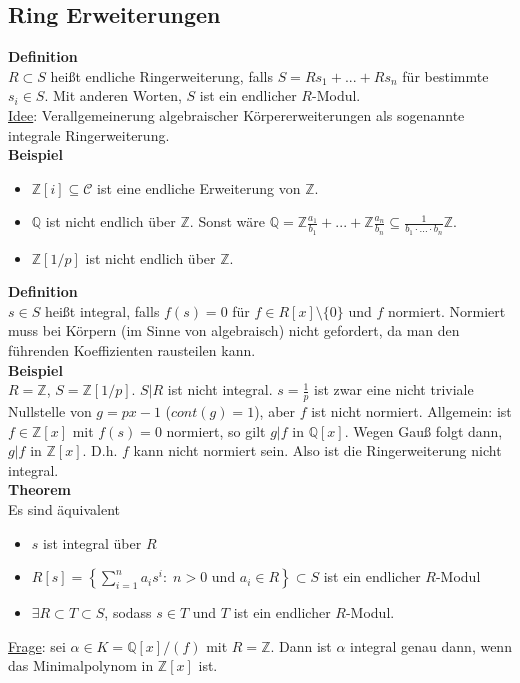 \documentclass[a4paper, 12pt]{article}
\begin{document}
\subsection{Ring Erweiterungen}
\textbf{Definition}\\
$R \subset S$ heißt endliche Ringerweiterung, falls $S = Rs_1+...+Rs_n$ für bestimmte $s_i \in S$. Mit anderen Worten, $S$ ist ein endlicher $R$-Modul.\\
\underline{Idee}: Verallgemeinerung algebraischer Körpererweiterungen als sogenannte integrale Ringerweiterung.\\
\textbf{Beispiel} \begin{itemize}
	\item $\mathbb{Z}[i] \subseteq \mathcal{C}$ ist eine endliche Erweiterung von $\mathbb{Z}$.
	\item $\mathbb{Q}$ ist nicht endlich über $\mathbb{Z}$. Sonst wäre $\mathbb{Q} = \mathbb{Z}\frac{a_1}{b_1} + ... + \mathbb{Z}\frac{a_n}{b_n} \subseteq \frac{1}{b_1 \cdot ... \cdot b_n}\mathbb{Z}$. 
	\item $\mathbb{Z}[1/p]$ ist nicht endlich über $\mathbb{Z}$.
\end{itemize} 
\textbf{Definition}\\
$s \in S$ heißt integral, falls $f(s) = 0$ für $f \in R[x]\setminus \{0\}$ und $f$ normiert. Normiert muss bei Körpern (im Sinne von algebraisch) nicht gefordert, da man den führenden Koeffizienten rausteilen kann.\\
\textbf{Beispiel}\\
$R = \mathbb{Z}$, $S = \mathbb{Z}[1/p]$. $S|R$ ist nicht integral. $s = \frac{1}{p}$ ist zwar eine nicht triviale Nullstelle von $g = px-1$ ($cont(g) = 1$), aber $f$ ist nicht normiert. Allgemein: ist $f \in \mathbb{Z}[x]$ mit $f(s) = 0$ normiert, so gilt $g | f$ in $\mathbb{Q}[x]$. Wegen Gauß folgt dann, $g | f$ in $\mathbb{Z}[x]$. D.h. $f$ kann nicht normiert sein. Also ist die Ringerweiterung nicht integral.\\
\textbf{Theorem}\\
Es sind äquivalent \begin{itemize}
	\item $s$ ist integral über $R$
	\item $R[s] = \left\{\sum_{i=1}^n a_i s^i: \; n > 0 \text{ und } a_i \in R\right\} \subset S$ ist ein endlicher $R$-Modul
	\item $\exists R \subset T \subset S$, sodass $s \in T$ und $T$ ist ein endlicher $R$-Modul.
\end{itemize}
\underline{Frage}: sei $\alpha \in K = \mathbb{Q}[x]/(f)$ mit $R = \mathbb{Z}$. Dann ist $\alpha$ integral genau dann, wenn das Minimalpolynom in $\mathbb{Z}[x]$ ist.\\
\end{document}
